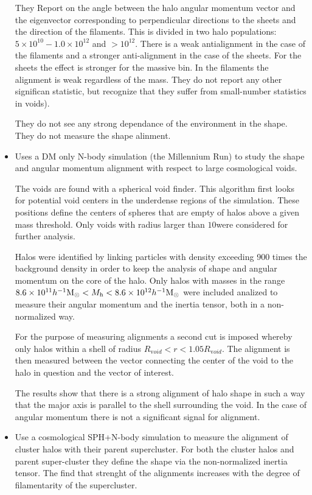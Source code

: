 \documentclass[usenatbib]{mn2e}
\newcommand{\hMpc}{{\ifmmode{h^{-1}{\rm Mpc}}\else{$h^{-1}$Mpc }\fi}}
\newcommand{\hMsun}{{\ifmmode{h^{-1}{\rm {M_{\odot}}}}\else{$h^{-1}{\rm{M_{\odot}}}$}\fi}}
\begin{document}
\begin{itemize}
They Report on the angle between the halo
angular momentum vector and the eigenvector corresponding to
perpendicular directions to the sheets and the direction of the
filaments. This is divided in two halo populations: $5\times 10^{10} -
1.0\times 10^{12}$ and $>10^{12}$. There is a weak antialignment in
the case of the filaments and a stronger anti-alignment in the case of
the sheets. For the sheets the effect is stronger for the massive
bin. In the filaments the alignment is weak regardless of the
mass. They do not report any other significan statistic, but recognize
that they suffer from small-number statistics in voids).


They do not see any strong dependance of the environment in the
shape. They do not measure the shape alinment.

\item
\citep{Brunino2007}
Uses a DM only N-body simulation (the Millennium Run) to study the
shape and angular momentum alignment with respect to large
cosmological voids. 

The voids are found with a spherical void finder. This algorithm first
looks for potential void centers in the underdense regions of the
simulation. These positions define the centers of spheres that are
empty of halos above a given mass threshold. Only voids with radius
larger than $10$\hMpc were considered for further analysis.

Halos were identified by linking particles with density exceeding 900
times the background density in order to keep the analysis of shape
and angular momentum on the core of the halo. Only halos with masses
in the range $8.6\times 10^{11}\hMsun < M_{\mathrm h}< 8.6\times
10^{12}\hMsun$ were included analized to measure their angular
momentum and the inertia tensor, both in a non-normalized way.

For the purpose of measuring alignments a second cut is imposed
whereby only halos within a shell of radius $R_{\mathrm void}<r<1.05R_{\mathrm
void}$. The alignment is then measured between the vector connecting
the center of the void to the halo in question and the vector of
interest.

The results show that there is a strong alignment of halo shape in
such a way that the major axis is parallel to the shell surrounding
the void. In the case of angular momentum there is not a significant
signal for alignment.




\item
\citep{Basilakos2006}
Use a cosmological SPH+N-body simulation to measure the alignment of
cluster halos with their parent supercluster. For both the cluster
halos and parent super-cluster they define the shape via the
non-normalized inertia tensor.  The find that strenght of the
alignments increases with the degree of filamentarity of the
supercluster.


\end{itemize}
\end{document}
